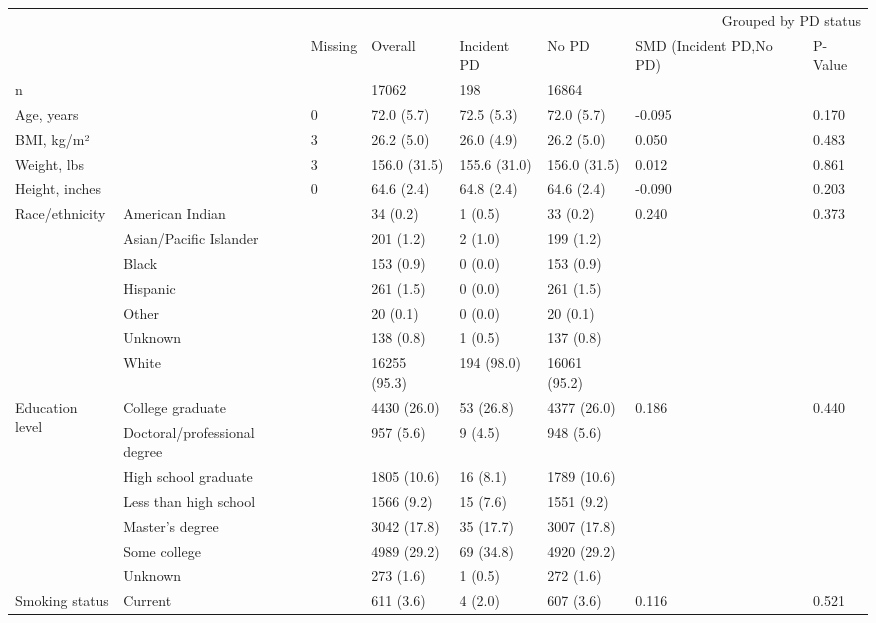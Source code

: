 \begin{tabular}{llllllll}
\toprule
 &  & \multicolumn{6}{r}{Grouped by PD status} \\
 &  & Missing & Overall & Incident PD & No PD & SMD (Incident PD,No PD) & P-Value \\
\midrule
n &  &  & 17062 & 198 & 16864 &  &  \\
\cline{1-8}
Age, years &  & 0 & 72.0 (5.7) & 72.5 (5.3) & 72.0 (5.7) & -0.095 & 0.170 \\
\cline{1-8}
BMI, kg/m² &  & 3 & 26.2 (5.0) & 26.0 (4.9) & 26.2 (5.0) & 0.050 & 0.483 \\
\cline{1-8}
Weight, lbs &  & 3 & 156.0 (31.5) & 155.6 (31.0) & 156.0 (31.5) & 0.012 & 0.861 \\
\cline{1-8}
Height, inches &  & 0 & 64.6 (2.4) & 64.8 (2.4) & 64.6 (2.4) & -0.090 & 0.203 \\
\cline{1-8}
\multirow[t]{7}{*}{Race/ethnicity} & American Indian &  & 34 (0.2) & 1 (0.5) & 33 (0.2) & 0.240 & 0.373 \\
 & Asian/Pacific Islander &  & 201 (1.2) & 2 (1.0) & 199 (1.2) &  &  \\
 & Black &  & 153 (0.9) & 0 (0.0) & 153 (0.9) &  &  \\
 & Hispanic &  & 261 (1.5) & 0 (0.0) & 261 (1.5) &  &  \\
 & Other &  & 20 (0.1) & 0 (0.0) & 20 (0.1) &  &  \\
 & Unknown &  & 138 (0.8) & 1 (0.5) & 137 (0.8) &  &  \\
 & White &  & 16255 (95.3) & 194 (98.0) & 16061 (95.2) &  &  \\
\cline{1-8}
\multirow[t]{7}{*}{Education level} & College graduate &  & 4430 (26.0) & 53 (26.8) & 4377 (26.0) & 0.186 & 0.440 \\
 & Doctoral/professional degree &  & 957 (5.6) & 9 (4.5) & 948 (5.6) &  &  \\
 & High school graduate &  & 1805 (10.6) & 16 (8.1) & 1789 (10.6) &  &  \\
 & Less than high school &  & 1566 (9.2) & 15 (7.6) & 1551 (9.2) &  &  \\
 & Master's degree &  & 3042 (17.8) & 35 (17.7) & 3007 (17.8) &  &  \\
 & Some college &  & 4989 (29.2) & 69 (34.8) & 4920 (29.2) &  &  \\
 & Unknown &  & 273 (1.6) & 1 (0.5) & 272 (1.6) &  &  \\
\cline{1-8}
\multirow[t]{4}{*}{Smoking status} & Current &  & 611 (3.6) & 4 (2.0) & 607 (3.6) & 0.116 & 0.521 \\

\end{tabular}
